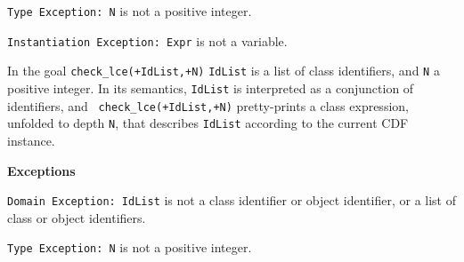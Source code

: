 \begin{description}
{\tt Type Exception: N} is not a positive integer.

{\tt Instantiation Exception: Expr} is not a variable.

In the goal {\tt check\_lce(+IdList,+N)} {\tt IdList} is a list of
class identifiers, and {\tt N} a positive integer.  In its semantics,
{\tt IdList} is interpreted as a conjunction of identifiers, and {\tt
check\_lce(+IdList,+N)} pretty-prints a class expression, unfolded to
depth {\tt N}, that describes {\tt IdList} according to the current
CDF instance.

{\bf Exceptions} 

{\tt Domain Exception: IdList} is not a class identifier or object
identifier, or a list of class or object identifiers.

{\tt Type Exception: N} is not a positive integer.

\end{description}

